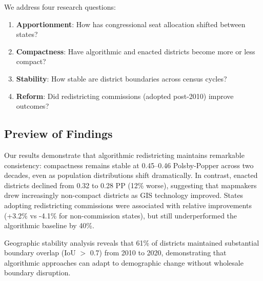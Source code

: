 We address four research questions:
\begin{enumerate}
    \item \textbf{Apportionment}: How has congressional seat allocation shifted between states?
    \item \textbf{Compactness}: Have algorithmic and enacted districts become more or less compact?
    \item \textbf{Stability}: How stable are district boundaries across census cycles?
    \item \textbf{Reform}: Did redistricting commissions (adopted post-2010) improve outcomes?
\end{enumerate}

\subsection{Preview of Findings}

Our results demonstrate that algorithmic redistricting maintains remarkable consistency: compactness remains stable at 0.45--0.46 Polsby-Popper across two decades, even as population distributions shift dramatically. In contrast, enacted districts declined from 0.32 to 0.28 PP (12\% worse), suggesting that mapmakers drew increasingly non-compact districts as GIS technology improved. States adopting redistricting commissions were associated with relative improvements (+3.2\% vs -4.1\% for non-commission states), but still underperformed the algorithmic baseline by 40\%.

Geographic stability analysis reveals that 61\% of districts maintained substantial boundary overlap (IoU $>$ 0.7) from 2010 to 2020, demonstrating that algorithmic approaches can adapt to demographic change without wholesale boundary disruption.
